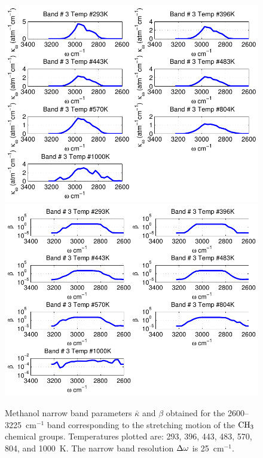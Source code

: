 \begin{figure}[p]
\begin{center}
\includegraphics[width=5.0in]{Figures/Methanol_Kappa_Band3_MALKMUS.pdf}
\includegraphics[width=5.0in]{Figures/Methanol_Beta_Band3_MALKMUS.pdf}
\end{center}
\caption{Methanol narrow band parameters $\bar{\kappa}$ and $\beta$ obtained for the 2600--3225~cm$^{-1}$ band corresponding to the stretching motion of the $\rm CH_3$ chemical groups. Temperatures plotted are: 293, 396, 443, 483, 570, 804, and 1000~K. The narrow band resolution $\Delta \omega$ is 25~cm$^{-1}$.\label{fig:methanol_kappa_beta3}}
\end{figure}

